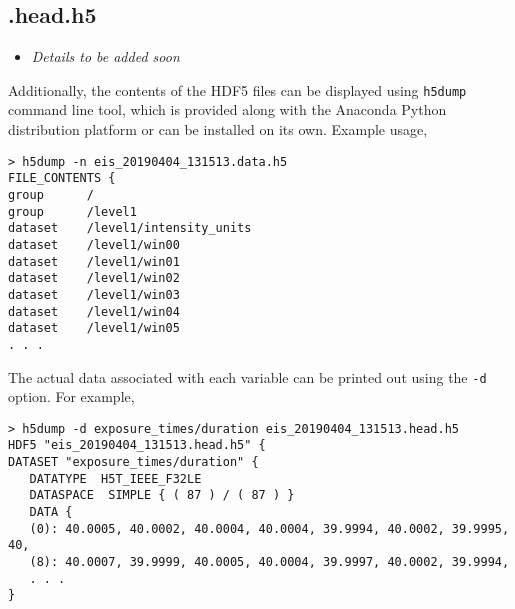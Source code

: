 \subsection{.head.h5}
\begin{itemize}
  \item \textit{Details to be added soon}
\end{itemize}

Additionally, the contents of the HDF5 files can be displayed using
\verb+h5dump+ command line tool, which is provided along with the Anaconda Python distribution
platform or can be installed on its own. Example usage,

\begin{lstlisting}
> h5dump -n eis_20190404_131513.data.h5
FILE_CONTENTS {
group      /
group      /level1
dataset    /level1/intensity_units
dataset    /level1/win00
dataset    /level1/win01
dataset    /level1/win02
dataset    /level1/win03
dataset    /level1/win04
dataset    /level1/win05
. . .
\end{lstlisting}
The actual data associated with each variable can be printed out using the \verb+-d+ option. For
example,
\begin{lstlisting}
> h5dump -d exposure_times/duration eis_20190404_131513.head.h5
HDF5 "eis_20190404_131513.head.h5" {
DATASET "exposure_times/duration" {
   DATATYPE  H5T_IEEE_F32LE
   DATASPACE  SIMPLE { ( 87 ) / ( 87 ) }
   DATA {
   (0): 40.0005, 40.0002, 40.0004, 40.0004, 39.9994, 40.0002, 39.9995, 40,
   (8): 40.0007, 39.9999, 40.0005, 40.0004, 39.9997, 40.0002, 39.9994,
   . . .
}
\end{lstlisting}
